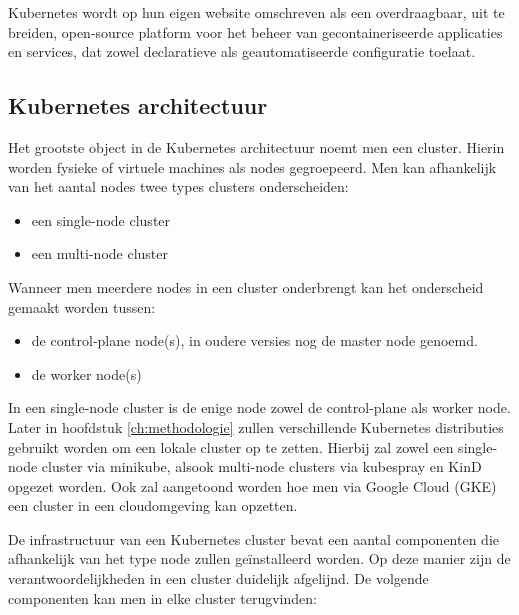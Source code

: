 Kubernetes wordt op hun eigen website omschreven als een overdraagbaar, uit te breiden, open-source platform voor het beheer van gecontaineriseerde applicaties en services, dat zowel declaratieve als geautomatiseerde configuratie toelaat.

\subsection{Kubernetes architectuur}

Het grootste object in de Kubernetes architectuur noemt men een cluster. Hierin worden fysieke of virtuele machines als nodes gegroepeerd. Men kan afhankelijk van het aantal nodes twee types clusters onderscheiden:

\begin{itemize}
    \item een single-node cluster 
    \item een multi-node cluster 
\end{itemize} 

Wanneer men meerdere nodes in een cluster onderbrengt kan het onderscheid gemaakt worden tussen:

\begin{itemize}
    \item de control-plane node(s), in oudere versies nog de master node genoemd.
    \item de worker node(s)
\end{itemize} 

In een single-node cluster is de enige node zowel de control-plane als worker node.
Later in hoofdstuk \ref{ch:methodologie} zullen verschillende Kubernetes distributies gebruikt worden om een lokale cluster op te zetten. Hierbij zal zowel een single-node cluster via minikube, alsook multi-node clusters via kubespray en KinD opgezet worden. Ook zal aangetoond worden hoe men via Google Cloud (GKE) een cluster in een cloudomgeving kan opzetten.

De infrastructuur van een Kubernetes cluster bevat een aantal componenten die afhankelijk van het type node zullen geïnstalleerd worden. Op deze manier zijn de verantwoordelijkheden in een cluster duidelijk afgelijnd. De volgende componenten kan men in elke cluster terugvinden: 

